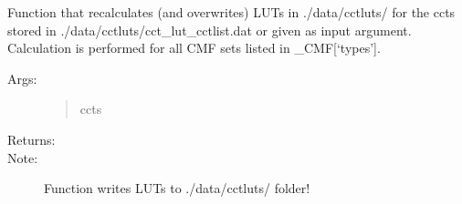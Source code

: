 \documentclass[letterpaper,10pt,english]{sphinxmanual}
\begin{document}
\begin{fulllineitems}
\label{\detokenize{color:luxpy.color.cct.calculate_luts}}
Function that recalculates (and overwrites) LUTs in ./data/cctluts/ 
for the ccts stored in ./data/cctluts/cct\_lut\_cctlist.dat or given as 
input argument. Calculation is performed for all CMF sets listed 
in \_CMF{[}‘types’{]}.
\begin{description}
\item[{Args:}] \leavevmode\begin{quote}\begin{description}
\item[{ccts}] \leavevmode
{}

\end{description}\end{quote}

\item[{Returns:}] \leavevmode
{}

\item[{Note:}] \leavevmode
Function writes LUTs to ./data/cctluts/ folder!

\end{description}

\end{fulllineitems}

\end{document}
